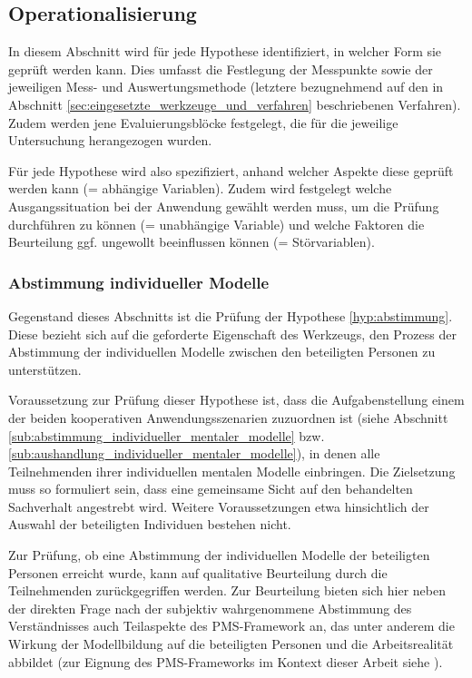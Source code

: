 \subsection{Operationalisierung} %
\label{sub:a_operationalisierung}

In diesem Abschnitt wird für jede Hypothese identifiziert, in welcher Form sie geprüft werden kann. Dies umfasst die Festlegung der Messpunkte sowie der jeweiligen Mess- und Auswertungsmethode (letztere bezugnehmend auf den in Abschnitt \ref{sec:eingesetzte_werkzeuge_und_verfahren} beschriebenen Verfahren). Zudem werden jene Evaluierungsblöcke festgelegt, die für die jeweilige Untersuchung herangezogen wurden.

Für jede Hypothese wird also spezifiziert, anhand welcher Aspekte diese geprüft werden kann (= abhängige Variablen). Zudem wird festgelegt welche Ausgangssituation bei der Anwendung gewählt werden muss, um die Prüfung durchführen zu können (= unabhängige Variable) und welche Faktoren die Beurteilung ggf. ungewollt beeinflussen können (= Störvariablen).

\subsubsection{Abstimmung individueller Modelle} %
\label{ssub:abstimmung_individueller_modelle}

Gegenstand dieses Abschnitts ist die Prüfung der Hypothese \ref{hyp:abstimmung}. Diese bezieht sich auf die geforderte Eigenschaft des Werkzeugs, den Prozess der Abstimmung der individuellen Modelle zwischen den beteiligten Personen zu unterstützen.

Voraussetzung zur Prüfung dieser Hypothese ist, dass die Aufgabenstellung einem der beiden kooperativen Anwendungsszenarien zuzuordnen ist (siehe Abschnitt \ref{sub:abstimmung_individueller_mentaler_modelle} bzw. \ref{sub:aushandlung_individueller_mentaler_modelle}), in denen alle Teilnehmenden ihrer individuellen mentalen Modelle einbringen. Die Zielsetzung muss so formuliert sein, dass eine gemeinsame Sicht auf den behandelten Sachverhalt angestrebt wird. Weitere Voraussetzungen etwa hinsichtlich der Auswahl der beteiligten Individuen bestehen nicht.

Zur Prüfung, ob eine Abstimmung der individuellen Modelle der beteiligten Personen erreicht wurde, kann auf qualitative Beurteilung durch die Teilnehmenden zurückgegriffen werden. Zur Beurteilung bieten sich hier neben der direkten Frage nach der subjektiv wahrgenommene Abstimmung des Verständnisses auch Teilaspekte des \gls{PMS}-Framework \citep{Sedera02} an, das unter anderem die Wirkung der Modellbildung auf die beteiligten Personen und die Arbeitsrealität abbildet (zur Eignung des \gls{PMS}-Frameworks im Kontext dieser Arbeit siehe \citep{Wahlmuller10}).

